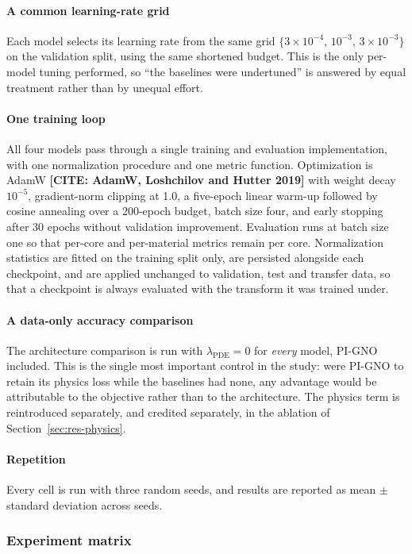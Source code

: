 \documentclass[preprint,12pt]{elsarticle}
\newcommand{\todocite}[1]{\textbf{[CITE: #1]}}
\begin{document}
\paragraph{A common learning-rate grid} Each model selects its learning rate
from the same grid $\{3\times10^{-4},\,10^{-3},\,3\times10^{-3}\}$ on the
validation split, using the same shortened budget. This is the only per-model
tuning performed, so ``the baselines were undertuned'' is answered by equal
treatment rather than by unequal effort.

\paragraph{One training loop} All four models pass through a single training
and evaluation implementation, with one normalization procedure and one metric
function. Optimization is AdamW \todocite{AdamW, Loshchilov and Hutter 2019}
with weight decay $10^{-5}$, gradient-norm clipping at 1.0, a five-epoch linear
warm-up followed by cosine annealing over a 200-epoch budget, batch size four,
and early stopping after 30 epochs without validation improvement. Evaluation
runs at batch size one so that per-core and per-material metrics remain
per core. Normalization statistics are fitted on the training split only, are
persisted alongside each checkpoint, and are applied unchanged to validation,
test and transfer data, so that a checkpoint is always evaluated with the
transform it was trained under.

\paragraph{A data-only accuracy comparison} The architecture comparison is run
with $\lambda_{\mathrm{PDE}}=0$ for \emph{every} model, PI-GNO included. This is
the single most important control in the study: were PI-GNO to retain its
physics loss while the baselines had none, any advantage would be attributable
to the objective rather than to the architecture. The physics term is
reintroduced separately, and credited separately, in the ablation of
Section~\ref{sec:res-physics}.

\paragraph{Repetition} Every cell is run with three random seeds, and results
are reported as mean $\pm$ standard deviation across seeds.

\subsubsection{Experiment matrix}
\label{sec:matrix}
\end{document}
